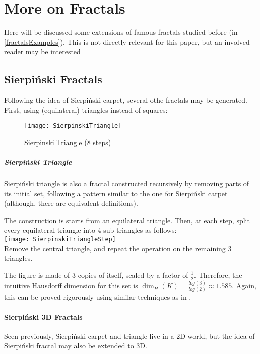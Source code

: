 \section{More on Fractals}
Here will be discussed some extensions of famous fractals studied before (in \ref{fractalsExamples}).
This is not directly relevant for this paper, but an involved reader may be interested

\subsection{Sierpiński Fractals}
Following the idea of Sierpiński carpet, several othe fractals may be generated.
First, using (equilateral) triangles instead of squares:

\begin{wrapfigure}{r}{5cm}
	\vspace{-0.5cm}
	\texttt{[image: SierpinskiTriangle]}
	\centering
	\captionsetup{justification=centering}
	\caption{Sierpinski Triangle (8 steps)}
	\label{fig:SierpinskiTriangle}
	\vspace{-3cm}
\end{wrapfigure}
\subparagraph{Sierpiński Triangle}
Sierpiński triangle is also a fractal constructed recursively by removing parts of its initial set, following a pattern similar to the one for Sierpiński carpet (although, there are equivalent definitions).

The construction is starts from an equilateral triangle.
Then, at each step, split every equilateral triangle into 4 sub-triangles as follows:\\
\texttt{[image: SierpinskiTriangleStep]}\\
Remove the central triangle, and repeat the operation on the remaining 3 triangles.

The figure is made of $3$ copies of itself, scaled by a factor of $\frac{1}{2}$.
Therefore, the intuitive Hausdorff dimension for this set is $\dim_H(K) = \frac{log(3)}{log(2)} \approx 1.585$.
Again, this can be proved rigorously using similar techniques as in \cite[p. 34-35, ex. 2.7]{Falconer_1990}.

\paragraph{Sierpiński 3D Fractals}
Seen previously, Sierpiński carpet and triangle live in a 2D world, but the idea of Sierpiński fractal may also be extended to 3D.

